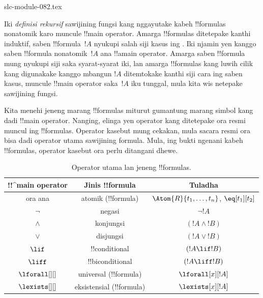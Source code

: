 \begin{filecontents*}[overwrite]{slc-module-082.tex}
\begin{explain}
Iki \emph{definisi rekursif} sawijining fungsi kang nggayutake kabeh
!!{formula}s nonatomik karo muncule !!{main operator}. Amarga
!!{formula}s ditetepake kanthi induktif, saben
!!{formula}~$!A$ nyukupi salah siji kasus ing .
Iki njamin yen kanggo saben !!{formula} nonatomik~$!A$ ana !!a{main
  operator}. Amarga saben !!{formula} mung nyukupi siji saka
syarat-syarat iki, lan amarga !!{formula}s kang luwih cilik kang
digunakake kanggo mbangun $!A$ ditemtokake kanthi siji cara ing
saben kasus, muncule !!{main
  operator} saka~$!A$ iku tunggal, mula kita wis netepake sawijining
fungsi.
\end{explain}

Kita menehi jeneng marang !!{formula}s miturut 
gumantung marang simbol kang dadi !!{main operator}.
{ Nanging, elinga yen operator kang ditetepake ora resmi muncul ing
!!{formula}s. Operator kasebut mung cekakan, mula sacara resmi ora
bisa dadi operator utama sawijining formula. Mula, ing bukti ngenani
kabeh !!{formula}s, operator kasebut ora perlu ditangani dhewe.}

\begin{table}[!h]
\centering
\begin{tabular}{c | c | c}
!!^{main operator} & Jinis !!{formula} & Tuladha\\
\hline
ora ana & atomik (!!{formula}) &
\iftag{prvFalse}{$\lfalse$,}{}
\iftag{prvTrue}{$\ltrue$,}{}
$\Atom{R}{t_1, \dots, t_n}$,
$\eq[t_1][t_2]$\\
$\lnot$ & negasi & $\lnot !A$ \\
$\land$ & konjungsi & $(!A \land !B)$ \\
$\lor$ & disjungsi & $(!A \lor !B)$ \\
$\lif$ & !!{conditional} & $(!A \lif !B)$ \\
$\liff$ & !!{biconditional} & $(!A \liff !B)$ \\
$\lforall[][]$ & universal (!!{formula})& $\lforall[x][!A]$ \\
$\lexists[][]$ & eksistensial (!!{formula})& $\lexists[x][!A]$
\end{tabular}
\caption{Operator utama lan jeneng !!{formula}s.}
\end{table}


\end{filecontents*}


